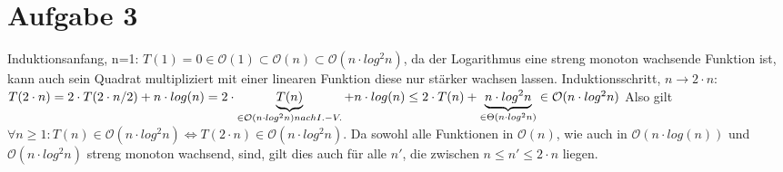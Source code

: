 \documentclass[a4paper,10pt,oneside,leqno]{scrartcl}
\begin{document}
\section*{Aufgabe 3}
Induktionsanfang, n=1:\newline
$T(1) = 0 \in \mathcal{O}(1) \subset \mathcal{O}(n) \subset \mathcal{O}(n\cdot log^2 n)$, da der Logarithmus eine streng monoton wachsende
Funktion ist, kann auch sein Quadrat multipliziert mit einer linearen Funktion diese nur stärker wachsen lassen.\newline
Induktionsschritt, $n\rightarrow 2\cdot n$:\newline
$T(2\cdot n) = 2\cdot T(2\cdot n/2)+n\cdot log(n) = 2\cdot \underbrace{T(n)}_{\in \mathcal{O}(n\cdot log^2 n)\newline nach I.-V.}+n\cdot log(n)
\leq 2\cdot T(n) + \underbrace{n\cdot log^2 n}_{\in \Theta(n\cdot log^2 n)}\in \mathcal{O}(n\cdot log^2 n)$\newline
Also gilt $\forall n \geq 1: T(n) \in \mathcal{O}(n\cdot log^2 n) \Leftrightarrow T(2\cdot n) \in \mathcal{O}(n\cdot log^2 n)$.\newline
Da sowohl alle Funktionen in $\mathcal{O}(n)$, wie auch in $\mathcal{O}(n\cdot log(n))$ und $\mathcal{O}(n\cdot log^2 n)$ streng monoton wachsend,
sind, gilt dies auch für alle $n'$, die zwischen $n\leq n' \leq 2\cdot n$ liegen.
\end{document}
